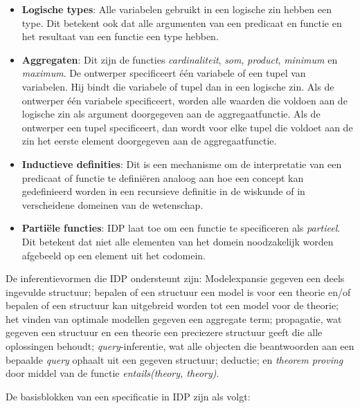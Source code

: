 \begin{itemize}
	\item \textbf{Logische types}: Alle variabelen gebruikt in een logische zin hebben een type. Dit betekent ook dat alle argumenten van een predicaat en functie en het resultaat van een functie een type hebben.
	\item \textbf{Aggregaten}: Dit zijn de functies \textit{cardinaliteit}, \textit{som}, \textit{product}, \textit{minimum} en \textit{maximum}. De ontwerper specificeert \'e\'en variabele of een tupel van variabelen. Hij bindt die variabele of tupel dan in een logische zin. Als de ontwerper \'e\'en variabele specificeert, worden alle waarden die voldoen aan de logische zin als argument doorgegeven aan de aggregaatfunctie. Als de ontwerper een tupel specificeert, dan wordt voor elke tupel die voldoet aan de zin het eerste element doorgegeven aan de aggregaatfunctie.
	\item \textbf{Inductieve definities}: Dit is een mechanisme om de interpretatie van een predicaat of functie te defini\"eren analoog aan hoe een concept kan gedefinieerd worden in een recursieve definitie in de wiskunde of in verscheidene domeinen van de wetenschap.
	\item \textbf{Parti\"ele functies}: IDP laat toe om een functie te specificeren als \textit{partieel}. Dit betekent dat niet alle elementen van het domein noodzakelijk worden afgebeeld op een element uit het codomein.
\end{itemize}

De inferentievormen die IDP ondersteunt zijn: Modelexpansie gegeven een deels ingevulde structuur; bepalen of een structuur een model is voor een theorie en/of bepalen of een structuur kan uitgebreid worden tot een model voor de theorie; het vinden van optimale modellen gegeven een aggregate term; propagatie, wat gegeven een structuur en een theorie een preciezere structuur geeft die alle oplossingen behoudt; \textit{query}-inferentie, wat alle objecten die beantwoorden aan een bepaalde \textit{query} ophaalt uit een gegeven structuur; deductie; en \textit{theorem proving} door middel van de functie \textit{entails(theory, theory)}.

De basisblokken van een specificatie in IDP zijn als volgt:

